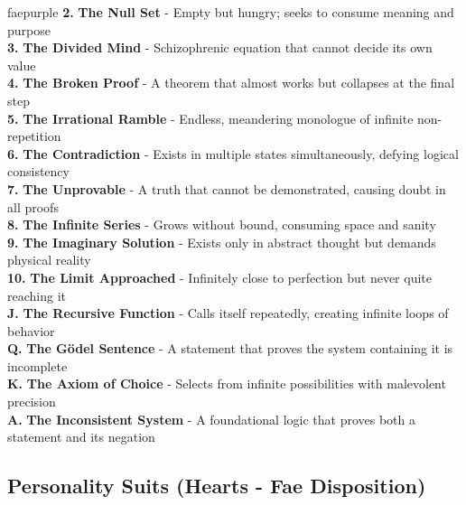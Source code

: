 \documentclass[11pt]{article}
\begin{document}
\begin{campaignsection}{faepurple}
\textbf{2.} \textbf{The Null Set} - Empty but hungry; seeks to consume meaning and purpose \\
\textbf{3.} \textbf{The Divided Mind} - Schizophrenic equation that cannot decide its own value \\
\textbf{4.} \textbf{The Broken Proof} - A theorem that almost works but collapses at the final step \\
\textbf{5.} \textbf{The Irrational Ramble} - Endless, meandering monologue of infinite non-repetition \\
\textbf{6.} \textbf{The Contradiction} - Exists in multiple states simultaneously, defying logical consistency \\
\textbf{7.} \textbf{The Unprovable} - A truth that cannot be demonstrated, causing doubt in all proofs \\
\textbf{8.} \textbf{The Infinite Series} - Grows without bound, consuming space and sanity \\
\textbf{9.} \textbf{The Imaginary Solution} - Exists only in abstract thought but demands physical reality \\
\textbf{10.} \textbf{The Limit Approached} - Infinitely close to perfection but never quite reaching it \\
\textbf{J.} \textbf{The Recursive Function} - Calls itself repeatedly, creating infinite loops of behavior \\
\textbf{Q.} \textbf{The Gödel Sentence} - A statement that proves the system containing it is incomplete \\
\textbf{K.} \textbf{The Axiom of Choice} - Selects from infinite possibilities with malevolent precision \\
\textbf{A.} \textbf{The Inconsistent System} - A foundational logic that proves both a statement and its negation

\subsection*{Personality Suits (Hearts - Fae Disposition)}


\end{campaignsection}
\end{document}
